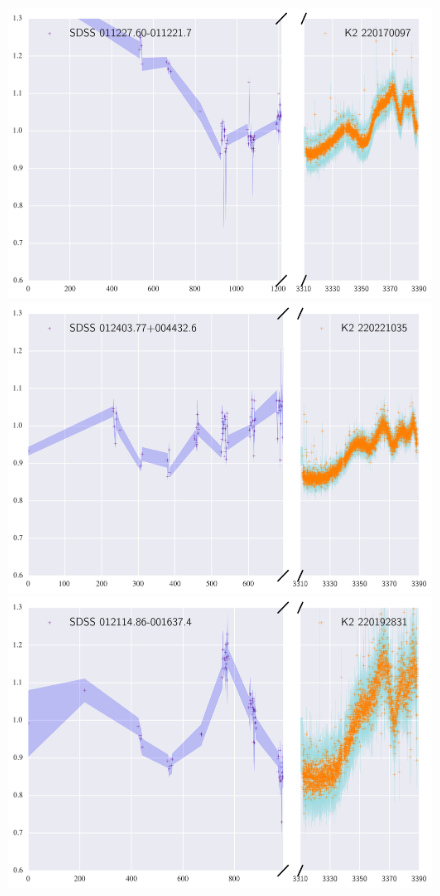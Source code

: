 \documentclass[a4paper,fleqn,usenatbib]{mnras}
\begin{document}
        \begin{figure}
        	\includegraphics[width=\columnwidth]{220170097ExtendedLC.png}
        	\includegraphics[width=\columnwidth]{220221035ExtendedLC.png}
        	\includegraphics[width=\columnwidth]{220192831ExtendedLC.png}
        	\caption{}
        	\label{fig:example_figure}
        \end{figure}      
        
\end{document}
